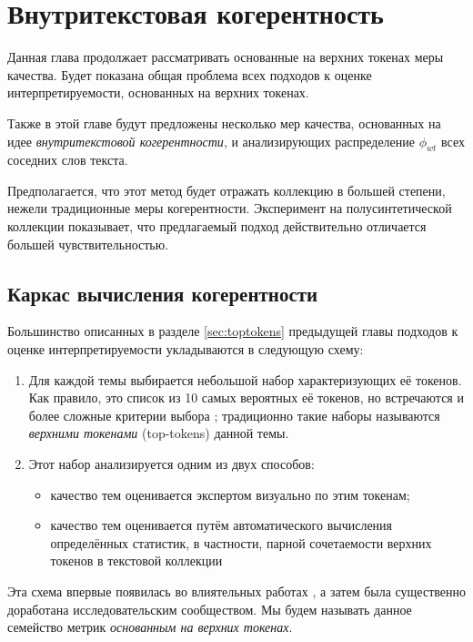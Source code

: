 \chapter{Внутритекстовая когерентность}
\label{chap:coh}

Данная глава продолжает рассматривать основанные на верхних токенах
меры качества. Будет показана общая проблема всех подходов к оценке интерпретируемости, основанных на верхних токенах.

Также в этой главе будут предложены несколько мер качества, основанных на идее \textit{внутритекстовой когерентности}, и анализирующих распределение $\phi_{wt}$ всех соседних слов текста.

Предполагается, что этот метод будет отражать коллекцию в большей степени, нежели традиционные меры когерентности. Эксперимент на полусинтетической коллекции показывает, что предлагаемый подход действительно отличается большей чувствительностью.

\section{Каркас вычисления когерентности}

Большинство описанных в разделе \ref{sec:toptokens} предыдущей главы подходов к оценке интерпретируемости укладываются в следующую схему:

\begin{enumerate}
    \item Для каждой темы выбирается небольшой набор характеризующих её токенов. Как правило, это список из 10 самых вероятных её токенов, но встречаются и более сложные критерии выбора \cite{Blei_lafferty,ldavis2014,boydcare,frex}; традиционно такие наборы называются \textit{верхними токенами} (top-tokens) данной темы.

    \item{Этот набор анализируется одним из двух способов:
    \begin{itemize}	
        \item качество тем оценивается экспертом визуально по этим токенам;
        \item качество тем оценивается путём автоматического вычисления определённых статистик, в частности, парной сочетаемости верхних токенов в текстовой коллекции
    \end{itemize}
    }
\end{enumerate}

Эта схема впервые появилась во влиятельных работах \cite{rtl,mrtl,newman2010automatic,mimno2011}, а затем была существенно доработана исследовательским сообществом. Мы будем называть данное семейство метрик \textit{основанным на верхних токенах}.

